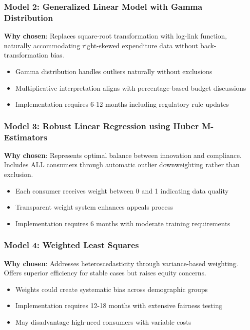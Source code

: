 \subsubsection{Model 2: Generalized Linear Model with Gamma Distribution}
\textbf{Why chosen}: Replaces square-root transformation with log-link function, naturally accommodating right-skewed expenditure data without back-transformation bias.
\begin{itemize}
    \item Gamma distribution handles outliers naturally without exclusions
    \item Multiplicative interpretation aligns with percentage-based budget discussions
    \item Implementation requires 6-12 months including regulatory rule updates
\end{itemize}

\subsubsection{Model 3: Robust Linear Regression using Huber M-Estimators}
\textbf{Why chosen}: Represents optimal balance between innovation and compliance. Includes ALL consumers through automatic outlier downweighting rather than exclusion.
\begin{itemize}
    \item Each consumer receives weight between 0 and 1 indicating data quality
    \item Transparent weight system enhances appeals process
    \item Implementation requires 6 months with moderate training requirements
\end{itemize}

\subsubsection{Model 4: Weighted Least Squares}
\textbf{Why chosen}: Addresses heteroscedasticity through variance-based weighting. Offers superior efficiency for stable cases but raises equity concerns.
\begin{itemize}
    \item Weights could create systematic bias across demographic groups
    \item Implementation requires 12-18 months with extensive fairness testing
    \item May disadvantage high-need consumers with variable costs
\end{itemize}

